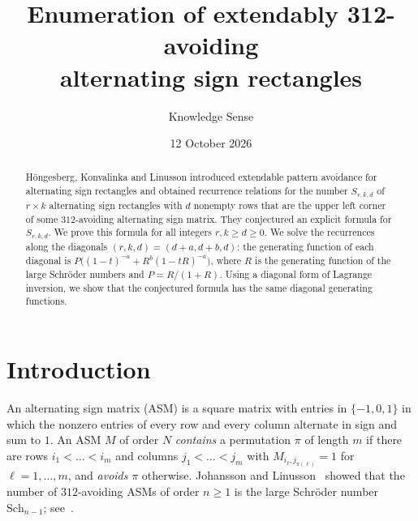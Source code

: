 \documentclass{amsart}
\theoremstyle{definition}
\theoremstyle{remark}
\numberwithin{equation}{section}
\newcommand{\Sch}{\mathrm{Sch}}
\begin{document}
\title[Extendably 312-avoiding alternating sign rectangles]{Enumeration of extendably 312-avoiding\\ alternating sign rectangles}

\author{Knowledge Sense}
\address{Knowledge Sense}

\date{12 October 2026}



\begin{abstract}
H\"ongesberg, Konvalinka and Linusson introduced extendable pattern avoidance for alternating sign rectangles and obtained recurrence relations for the number $S_{r,k,d}$ of $r\times k$ alternating sign rectangles with $d$ nonempty rows that are the upper left corner of some $312$-avoiding alternating sign matrix. They conjectured an explicit formula for $S_{r,k,d}$. We prove this formula for all integers $r,k\ge d\ge 0$. We solve the recurrences along the diagonals $(r,k,d)=(d+a,d+b,d)$: the generating function of each diagonal is $P\bigl((1-t)^{-a}+R^b(1-tR)^{-a}\bigr)$, where $R$ is the generating function of the large Schr\"oder numbers and $P=R/(1+R)$. Using a diagonal form of Lagrange inversion, we show that the conjectured formula has the same diagonal generating functions.
\end{abstract}

\maketitle

\section{Introduction}

An alternating sign matrix (ASM) is a square matrix with entries in $\{-1,0,1\}$ in which the nonzero entries of every row and every column alternate in sign and sum to $1$. An ASM $M$ of order $N$ \emph{contains} a permutation $\pi$ of length $m$ if there are rows $i_1<\dots<i_m$ and columns $j_1<\dots<j_m$ with $M_{i_\ell,j_{\pi(\ell)}}=1$ for $\ell=1,\dots,m$, and \emph{avoids} $\pi$ otherwise. Johansson and Linusson~\cite{JL07} showed that the number of $312$-avoiding ASMs of order $n\ge1$ is the large Schr\"oder number $\Sch_{n-1}$; see~\cite{OEIS}.
\end{document}
